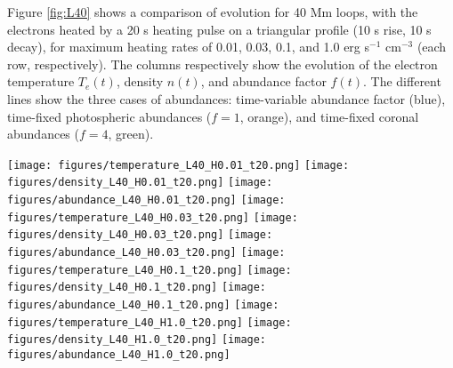 \documentclass[twocolumn]{aastex631}
\begin{document}
Figure \ref{fig:L40} shows a comparison of evolution for 40 Mm loops, with the electrons heated by a 20 s heating pulse on a triangular profile (10 s rise, 10 s decay), for maximum heating rates of 0.01, 0.03, 0.1, and 1.0 erg s$^{-1}$ cm$^{-3}$ (each row, respectively).  The columns respectively show the evolution of the electron temperature $T_{e}(t)$, density $n(t)$, and abundance factor $f(t)$.  The different lines show the three cases of abundances: time-variable abundance factor (blue), time-fixed photospheric abundances ($f=1$, orange), and time-fixed coronal abundances ($f=4$, green).  
\begin{figure*}
    \begin{centering}
    \texttt{[image: figures/temperature\_L40\_H0.01\_t20.png]}
    \texttt{[image: figures/density\_L40\_H0.01\_t20.png]}
    \texttt{[image: figures/abundance\_L40\_H0.01\_t20.png]}
    \texttt{[image: figures/temperature\_L40\_H0.03\_t20.png]}
    \texttt{[image: figures/density\_L40\_H0.03\_t20.png]}
    \texttt{[image: figures/abundance\_L40\_H0.03\_t20.png]}    \texttt{[image: figures/temperature\_L40\_H0.1\_t20.png]}
    \texttt{[image: figures/density\_L40\_H0.1\_t20.png]}
    \texttt{[image: figures/abundance\_L40\_H0.1\_t20.png]}
    \texttt{[image: figures/temperature\_L40\_H1.0\_t20.png]}
    \texttt{[image: figures/density\_L40\_H1.0\_t20.png]}
    \texttt{[image: figures/abundance\_L40\_H1.0\_t20.png]}
    \caption{The evolution of the electron temperature (left column), density (center column), and abundance factor (right column) for a 40 Mm coronal loop, heated with 0.01, 0.03, 0.1, and 1.0 erg s$^{-1}$ cm$^{-3}$ (rows), for a 20 s heating pulse.  The blue lines show the case with time-variable abundances $f(t)$, while orange lines show time-fixed photospheric abundances ($f=1$), and green time-fixed coronal abundances ($f=4$). }
    \label{fig:L40}
    \end{centering}
\end{figure*}
\end{document}
